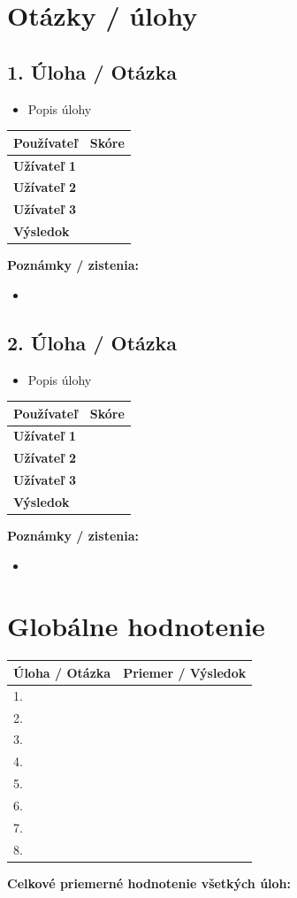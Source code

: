 \documentclass[a4paper,12pt]{article}
\begin{document}
\section*{Otázky / úlohy}

\subsection*{1. Úloha / Otázka}
\begin{itemize}
    \item Popis úlohy
\end{itemize}

\begin{longtable}{>{\bfseries}l c}
\toprule
Používateľ & Skóre \\
\midrule
Užívateľ 1 & \\ %
Užívateľ 2 & \\ %
Užívateľ 3 & \\ %
Výsledok & \\ %
\bottomrule
\end{longtable}

\textbf{Poznámky / zistenia:}
\begin{itemize}
    \item %
\end{itemize}

\newpage
\subsection*{2. Úloha / Otázka}
\begin{itemize}
    \item Popis úlohy
\end{itemize}

\begin{longtable}{>{\bfseries}l c}
\toprule
Používateľ & Skóre \\
\midrule
Užívateľ 1 & \\ 
Užívateľ 2 & \\ 
Užívateľ 3 & \\ 
Výsledok & \\ 
\bottomrule
\end{longtable}

\textbf{Poznámky / zistenia:}
\begin{itemize}
    \item 
\end{itemize}


\newpage
\section*{Globálne hodnotenie}
\begin{longtable}{l c}
\toprule
Úloha / Otázka & Priemer / Výsledok \\
\midrule
1. & \\ %
2. & \\
3. & \\
4. & \\
5. & \\
6. & \\
7. & \\
8. & \\
\bottomrule
\end{longtable}

\textbf{Celkové priemerné hodnotenie všetkých úloh:} \\ %
\end{document}
